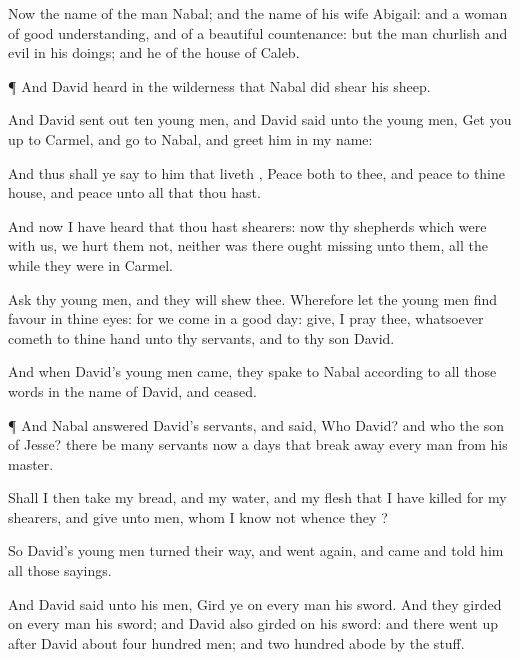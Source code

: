 {Now the
name of the
man
{}
Nabal; and the
name of his
wife
Abigail: and
{} a
woman of
good
understanding, and of a
beautiful
countenance: but the
man
{}
churlish and
evil in his
doings; and he
{} of the house of
Caleb.


\par }{\PP {}¶ And
David
heard in the
wilderness that
Nabal did
shear his
sheep.

And
David sent
out
ten young
men, and
David
said unto the young
men, Get you
up to
Carmel, and
go to
Nabal, and
greet him in my
name:

And thus shall ye
say to him that
liveth
{},
Peace
{} both to thee, and
peace
{} to thine
house, and
peace
{} unto all that thou hast.

And now I have
heard that thou hast
shearers: now thy
shepherds which were with us, we
hurt them not, neither was there
ought
missing unto them, all the
while they were in
Carmel.

Ask thy young
men, and they will
shew thee. Wherefore let the young
men
find
favour in thine
eyes: for we
come in a
good
day:
give, I pray thee, whatsoever
cometh to thine
hand unto thy
servants, and to thy
son
David.

And when
David’s young
men
came, they
spake to
Nabal according to all those
words in the
name of
David, and
ceased.


\par }{\PP {}¶ And
Nabal
answered
David’s
servants, and
said, Who
{}
David? and who
{} the
son of
Jesse? there be
many
servants now a
days that break
away every
man
from his
master.

Shall I then
take my
bread, and my
water, and my
flesh that I have
killed for my
shearers, and
give
{} unto
men, whom I
know not whence they
{}?


\par }{\PP {}So
David’s young
men
turned their
way, and went
again, and
came and
told him all those
sayings.

And
David
said unto his
men, Gird ye
on every
man his
sword. And they girded
on every
man his
sword; and
David also girded
on his
sword: and there went
up
after
David about
four
hundred
men; and two
hundred
abode by the
stuff.


}
